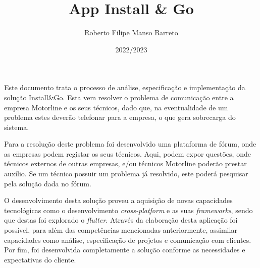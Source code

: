 \documentclass[a4paper,12pt,twoside]{book}
\title{App Install \& Go}
\author{Roberto Filipe Manso Barreto}
\date{2022/2023}
\begin{document}
\frontmatter

\maketitle


\begin{resumo}
Este documento trata o processo de análise, especificação e implementação da solução Install\&Go. Esta vem resolver o problema de comunicação entre a empresa Motorline e os seus técnicos, dado que, na eventualidade de um problema estes deverão telefonar para a empresa, o que gera sobrecarga do sistema.

Para a resolução deste problema foi desenvolvido uma plataforma de fórum, onde as empresas podem registar os seus técnicos. Aqui, podem expor questões, onde técnicos externos de outras empresas, e/ou técnicos Motorline poderão prestar auxílio. Se um técnico possuir um problema já resolvido, este poderá pesquisar pela solução dada no fórum.

O desenvolvimento desta solução proveu a aquisição de novas capacidades tecnológicas como o desenvolvimento \textit{cross-platform} e as suas \textit{frameworks}, sendo que destas foi explorado o \textit{flutter}. Através da elaboração desta aplicação foi possível, para além das competências mencionadas anteriormente, assimilar capacidades como análise, especificação de projetos e comunicação com clientes. Por fim, foi desenvolvida completamente a solução conforme as necessidades e expectativas do cliente.



\end{resumo}
\end{document}
